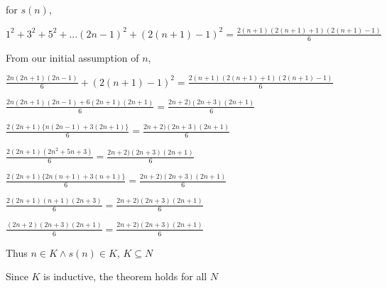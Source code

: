 \documentclass{article}
\begin{document}
            for $s(n)$,
            
                $ 1^2 + 3^2 + 5^2 + ...(2n -1)^2 + (2(n + 1)-1)^2 = \frac{2(n + 1)(2(n + 1) + 1)(2(n + 1) -1)}{6} $

                From our initial assumption of $n$,
                
                $\frac{2n(2n + 1)(2n -1)}{6} + (2(n + 1)-1)^2 = \frac{2(n + 1)(2(n + 1) + 1)(2(n + 1) -1)}{6} $

                $\frac{2n(2n + 1)(2n - 1) + 6(2n + 1)(2n + 1)}{6}  =  \frac{2n + 2)(2n + 3)(2n + 1)}{6} $
                
                $\frac{2(2n + 1)\{n(2n -1) + 3(2n + 1)\}}{6} =  \frac{2n + 2)(2n + 3)(2n + 1)}{6} $
                
                $\frac{2(2n + 1)(2n^2 + 5n + 3)}{6} =  \frac{2n + 2)(2n + 3)(2n + 1)}{6} $
                
                $\frac{2(2n + 1)\{ 2n(n + 1) +3 (n + 1)\}}{6} =  \frac{2n + 2)(2n + 3)(2n + 1)}{6} $
                
                $\frac{2(2n + 1)(n + 1)(2n + 3)}{6} =  \frac{2n + 2)(2n + 3)(2n + 1)}{6} $
                
                $\frac{(2n + 2)(2n + 3)(2n + 1)}{6} =  \frac{2n + 2)(2n + 3)(2n + 1)}{6} $

                Thus $ n \in K \land s(n) \in K$, $K \subseteq N$

                Since $K$ is inductive, the theorem holds for all $N$ 
			
\end{document}
